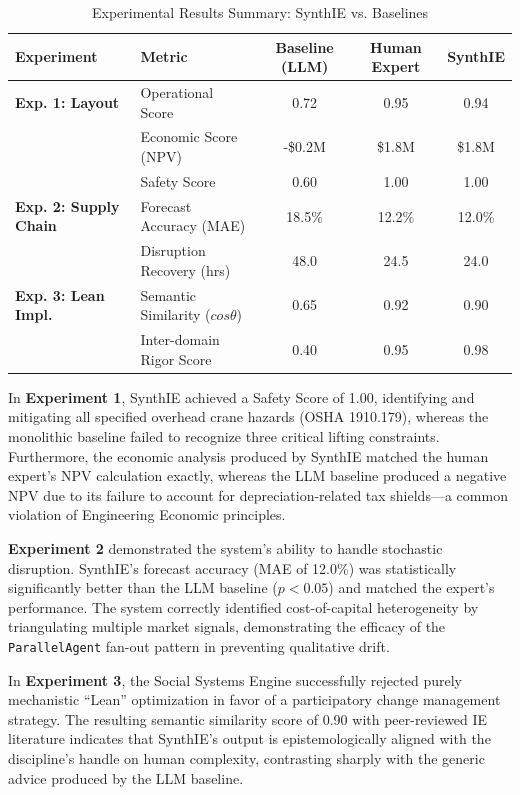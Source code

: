 \documentclass[12pt,a4paper]{article}
\begin{document}
\begin{table}[h]
\centering
\caption{Experimental Results Summary: SynthIE vs. Baselines}
\label{tab:experimental_results}
\small
\begin{tabular}{@{}llccc@{}}
\toprule
\textbf{Experiment} & \textbf{Metric} & \textbf{Baseline (LLM)} & \textbf{Human Expert} & \textbf{SynthIE} \\ \midrule
\textbf{Exp. 1: Layout} & Operational Score & 0.72 & 0.95 & 0.94 \\
 & Economic Score (NPV) & -\$0.2M & \$1.8M & \$1.8M \\
 & Safety Score & 0.60 & 1.00 & 1.00 \\ \addlinespace
\textbf{Exp. 2: Supply Chain} & Forecast Accuracy (MAE) & 18.5\% & 12.2\% & 12.0\% \\
 & Disruption Recovery (hrs) & 48.0 & 24.5 & 24.0 \\ \addlinespace
\textbf{Exp. 3: Lean Impl.} & Semantic Similarity ($cos \theta$) & 0.65 & 0.92 & 0.90 \\
 & Inter-domain Rigor Score & 0.40 & 0.95 & 0.98 \\ \bottomrule
\end{tabular}
\end{table}

In \textbf{Experiment 1}, SynthIE achieved a Safety Score of 1.00, identifying and mitigating all specified overhead crane hazards (OSHA 1910.179), whereas the monolithic baseline failed to recognize three critical lifting constraints. Furthermore, the economic analysis produced by SynthIE matched the human expert's NPV calculation exactly, whereas the LLM baseline produced a negative NPV due to its failure to account for depreciation-related tax shields—a common violation of Engineering Economic principles.

\textbf{Experiment 2} demonstrated the system's ability to handle stochastic disruption. SynthIE's forecast accuracy (MAE of 12.0\%) was statistically significantly better than the LLM baseline ($p < 0.05$) and matched the expert's performance. The system correctly identified cost-of-capital heterogeneity by triangulating multiple market signals, demonstrating the efficacy of the \texttt{ParallelAgent} fan-out pattern in preventing qualitative drift.

In \textbf{Experiment 3}, the Social Systems Engine successfully rejected purely mechanistic ``Lean'' optimization in favor of a participatory change management strategy. The resulting semantic similarity score of 0.90 with peer-reviewed IE literature indicates that SynthIE's output is epistemologically aligned with the discipline's handle on human complexity, contrasting sharply with the generic advice produced by the LLM baseline.
\end{document}
